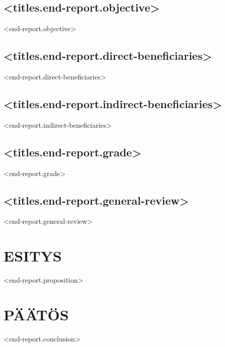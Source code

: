 \documentclass[twoside,a4paper]{article}
\begin{document}
		\subsection*{<titles.end-report.objective>}
		    <end-report.objective>
		
		\subsection*{<titles.end-report.direct-beneficiaries>}
		    <end-report.direct-beneficiaries>
		
		\subsection*{<titles.end-report.indirect-beneficiaries>}
		    <end-report.indirect-beneficiaries>
		
		\subsection*{<titles.end-report.grade>}
		    <end-report.grade>
		
		\subsection*{<titles.end-report.general-review>}
		    <end-report.general-review>
		
		\newpage	
	\section{ESITYS}
		<end-report.proposition>
		
	\section{PÄÄTÖS}		
		<end-report.conclusion>
	
\end{document}
